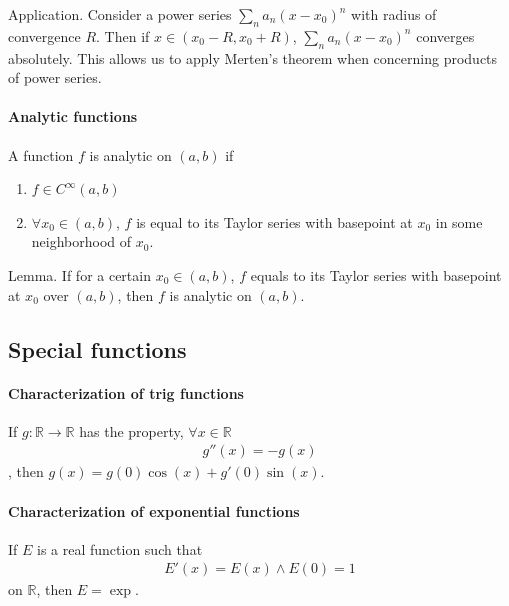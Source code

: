 \documentclass{article}
\begin{document}
Application. Consider a power series $\sum_n a_n(x-x_0)^n$ with radius of convergence $R$. Then if $x\in (x_0-R, x_0+R)$, $\sum_n a_n(x-x_0)^n$ converges absolutely. This allows us to apply Merten's theorem when concerning products of power series.

\paragraph{Analytic functions} A function $f$ is analytic on $(a,b)$ if
\begin{enumerate}
	\item $f\in C^\infty(a,b)$
	\item $\forall x_0\in (a,b)$, $f$ is equal to its Taylor series with basepoint at $x_0$ in some neighborhood of $x_0$.
\end{enumerate}

Lemma. If for a certain $x_0\in (a,b)$, $f$ equals to its Taylor series with basepoint at $x_0$ over $(a,b)$, then $f$ is analytic on $(a,b)$.

\subsection{Special functions}
\paragraph{Characterization of trig functions} If $g:\mathbb{R}\rightarrow \mathbb{R}$ has the property, $\forall x\in \mathbb{R}$
\begin{align*}
	g''(x) = -g(x)
\end{align*}, then $g(x) = g(0)\cos(x) + g'(0)\sin(x)$.

\paragraph{Characterization of exponential functions} If $E$ is a real function such that
\begin{align*}
	E'(x) = E(x) \land E(0) = 1
\end{align*}
on $\mathbb{R}$, then $E=\exp$.
\end{document}
